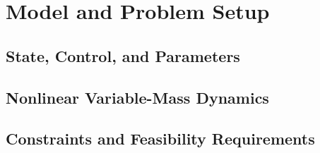\section{Model and Problem Setup}
\label{sec:model_setup}


\subsection{State, Control, and Parameters}
\label{subsec:state_control_params}


\subsection{Nonlinear Variable-Mass Dynamics}
\label{subsec:nonlinear_dynamics}


\subsection{Constraints and Feasibility Requirements}
\label{subsec:constraints_feasibility}

